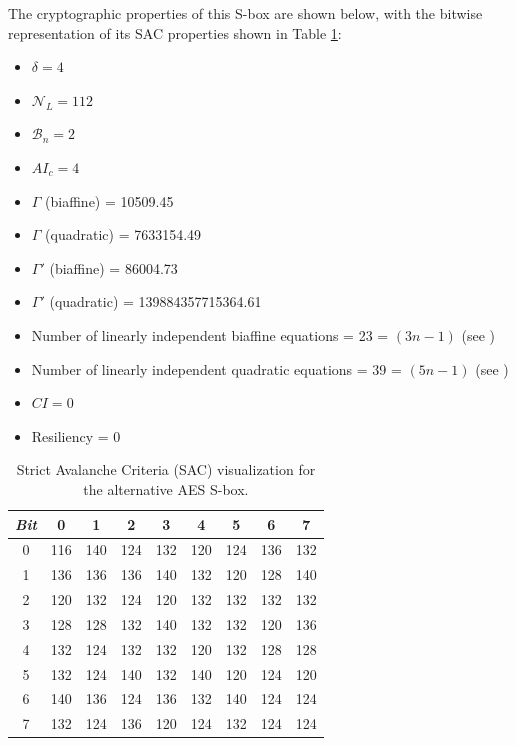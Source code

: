 The cryptographic properties of this S-box are shown below, with the bitwise representation of its SAC properties shown in Table \ref{tab:aesAltSAC}:
\begin{itemize}
 \itemsep0em
    \item $\delta = 4$
    \item $\mathcal{N}_L = 112$
    \item $\mathcal{B}_n = 2$
    \item $AI_c = 4$
    \item $\Gamma$ (biaffine) = 10509.45 
    \item $\Gamma$ (quadratic) = 7633154.49
    \item $\Gamma'$ (biaffine) = 86004.73
    \item $\Gamma'$ (quadratic) = 139884357715364.61
    \item Number of linearly independent biaffine equations = 23 = $(3n - 1)$ (see \cite{Courtois05-1})
    \item Number of linearly independent quadratic equations = 39 = $(5n - 1)$ (see \cite{Courtois05-1})
    \item $CI = 0$
    \item Resiliency = 0
\end{itemize}

\begin{table}[ht!]
\begin{center}
    \caption{Strict Avalanche Criteria (SAC) visualization for the alternative AES S-box.}
    \label{tab:aesAltSAC}
    \begin{tabular}{|c|c|c|c|c|c|c|c|c|} \hline
    \emph{Bit} & 0 & 1 & 2 & 3 & 4 & 5 & 6 & 7 \\ \hline
    0 & 116 & 140 & 124 & 132 & 120 & 124 & 136 & 132 \\ 
    1 & 136 & 136 & 136 & 140 & 132 & 120 & 128 & 140 \\
    2 & 120 & 132 & 124 & 120 & 132 & 132 & 132 & 132 \\
    3 & 128 & 128 & 132 & 140 & 132 & 132 & 120 & 136 \\
    4 & 132 & 124 & 132 & 132 & 120 & 132 & 128 & 128 \\
    5 & 132 & 124 & 140 & 132 & 140 & 120 & 124 & 120 \\
    6 & 140 & 136 & 124 & 136 & 132 & 140 & 124 & 124 \\ 
    7 & 132 & 124 & 136 & 120 & 124 & 132 & 124 & 124 \\ \hline
    \end{tabular}
\end{center}
\end{table}

